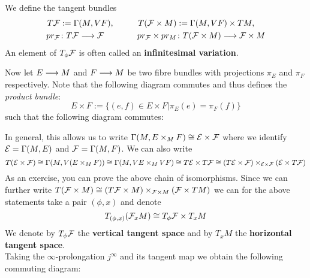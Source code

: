 \begin{definition}
  We define the tangent bundles
  \begin{align*}
    T{\mathcal{F}} &:= \Gamma(M, VF), \quad &\quad T({\mathcal{F}}\times M) &:= \Gamma(M, VF) \times TM,\\
    pr_\mathcal{F} &\colon T{\mathcal{F}} \longrightarrow {\mathcal{F}} & pr_{{\mathcal{F}}} \times pr_M &\colon T({\mathcal{F}}\times M) \longrightarrow {\mathcal{F}} \times M
  \end{align*}
  An element of $T_\phi\FF$ is often called an \textbf{infinitesimal variation}.
\end{definition}

Now let $E \longrightarrow M$ and $F\longrightarrow M$ be two fibre bundles with projections $\pi_E$ and $\pi_F$ respectively. Note that the following diagram commutes and thus defines the \emph{product bundle}:
$$ E\times F := \{ (e,f) \in E\times F \big| \pi_E(e)=\pi_F(f) \} $$
such that the following diagram commutes:
\begin{center}
\end{center}

In general, this allows us to write $\Gamma(M, E \times_M F) \cong {\mathcal{E}} \times {\mathcal{F}}$ where we identify ${\mathcal{E}} = \Gamma(M,E)$ and ${\mathcal{F}} = \Gamma(M,F)$. We can also write
$$T({\mathcal{E}} \times {\mathcal{F}}) \cong \Gamma(M, V(E\times_M F)) \cong \Gamma(M, VE \times_M VF) \cong T{\mathcal{E}} \times T{\mathcal{F}} \cong (T{\mathcal{E}} \times {\mathcal{F}}) \times_{{\mathcal{E}}\times{\mathcal{F}}} ({\mathcal{E}}\times T{\mathcal{F}}) $$
As an exercise, you can prove the above chain of isomorphisms. Since we can further write $T({\mathcal{F}}\times M) \cong (T{\mathcal{F}} \times M) \times_{{\mathcal{F}}\times M} ({\mathcal{F}} \times TM)$ we can for the above statements take a pair $(\phi, x)$ and denote
$$ T_{(\phi, x)}(\FF_x M) \cong T_\phi \FF \times T_x M $$
We denote by $T_\phi \FF$ the \textbf{vertical tangent space} and by $T_x M$ the \textbf{horizontal tangent space}.\\

Taking the $\infty$-prolongation $j^\infty$ and its tangent map we obtain the following commuting diagram:
\begin{center}
\end{center}

